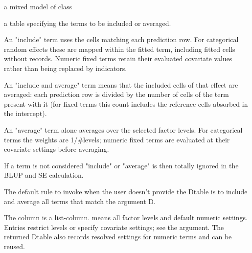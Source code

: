 \documentclass[a4paper]{book}
\begin{document}
\begin{Arguments}
\begin{ldescription}
\item[\code{object}] a mixed model of class 
\item[\code{Dtable}] a table specifying the terms to be included or averaged.

An "include" term uses the cells matching each prediction row. For
categorical random effects these are mapped within the fitted term, including
fitted cells without records. Numeric fixed terms retain their evaluated
covariate values rather than being replaced by indicators.

An "include and average" term means that the included cells of that effect are averaged: each prediction row is divided by the number of cells of the term present with it (for fixed terms this count includes the reference cells absorbed in the intercept).

An "average" term alone averages over the selected factor levels. For
categorical terms the weights are 1/\#levels; numeric fixed terms are
evaluated at their covariate settings before averaging.

If a term is not considered "include" or "average" is then totally ignored in the BLUP and SE calculation. 

The default rule to invoke when the user doesn't provide the Dtable is to include and average all terms that match the argument D.

The  column is a list-column.  means all factor
levels and default numeric settings. Entries restrict levels or specify
covariate settings; see the  argument. The returned Dtable also
records resolved settings for numeric terms and can be reused.



\end{ldescription}
\end{Arguments}
\end{document}
